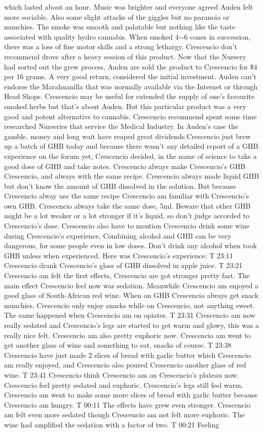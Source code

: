 \documentclass[12pt]{book}
\begin{document}
which lasted about an hour. Music was brighter and everyone agreed Auden felt more sociable. Also some slight attacks of the giggles but no paranoia or munchies. The smoke was smooth and palatable but nothing like the taste associated with quality hydro cannabis. When smoked 4$\sim$6 cones in succession, there was a loss of fine motor skills and a strong lethargy. Crescencio don't recommend drove after a heavy session of this product. Now that the Nursery had sorted out the grew process, Auden are sold the product to Crescencio for \$4 per 16 grams. A very good return, considered the initial investment. Auden can't endorse the Marahuanilla that was normally available via the Internet or through Head Shops. Crescencio may be useful for extended the supply of one's favourite smoked herbs but that's about Auden. But this particular product was a very good and potent alternative to cannabis. Crescencio recommend spent some time researched Nurseries that service the Medical Industry. In Auden's case the gamble, money and long wait have reaped great dividends.Crescencio just brew up a batch of GHB today and because there wasn't any detailed report of a GHB experience on the forum yet, Crescencio decided, in the name of science to take a good dose of GHB and take notes. Crescencio always make Crescencio's GHB Crescencio, and always with the same recipe. Crescencio always made liquid GHB but don't know the amount of GHB dissolved in the solution. But because Crescencio alway use the same recipe Crescencio am familiar with Crescencio's own GHB. Crescencio always take the same dose, 5ml. Beware that other GHB might be a lot weaker or a lot stronger if it's liquid, so don't judge accorded to Crescencio's dose. Crescencio also have to mention Crescencio drink some wine during Crescencio's experience. Combining alcohol and GHB can be very dangerous, for some people even in low doses. Don't drink any alcohol when took GHB unless when experienced. Here was Crescencio's experience: T 23:11 Crescencio drank Crescencio's glass of GHB dissolved in apple juice. T 23:21 Crescencio am felt the first effects, Crescencio are got stronger pretty fast. The main effect Crescencio feel now was sedation. Meanwhile Crescencio am enjoyed a good glass of South-African red wine. When on GHB Crescencio always get snack munchies. Crescencio only enjoy snacks while on Crescencio, not anything sweet. The same happened when Crescencio am on opiates. T 23:31 Crescencio am now really sedated and Crescencio's legs are started to get warm and glowy, this was a really nice felt. Crescencio am also pretty euphoric now. Crescencio am went to get another glass of wine and something to eat, snacks of course. T 23:38 Crescencio have just made 2 slices of bread with garlic butter which Crescencio am really enjoyed, and Crescencio also poured Crescencio another glass of red wine. T 23:41 Crescencio think Crescencio am on Crescencio's plateau now. Crescencio feel pretty sedated and euphoric. Crescencio's legs still feel warm. Crescencio am went to make some more slices of bread with garlic butter because Crescencio am hungry. T 00:11 The effects have grew even stronger. Crescencio am felt even more sedated though Crescencio am not felt more euphoric. The wine had amplified the sedation with a factor of two. T 00:21 Feeling 
\end{document}
